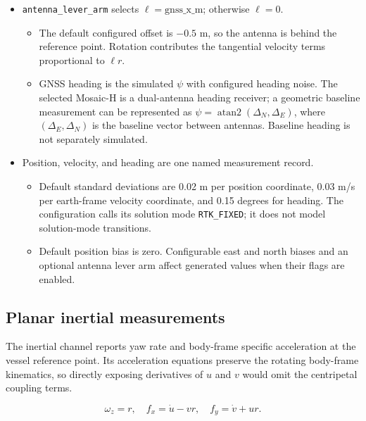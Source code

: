 \documentclass[10pt,letterpaper]{article}
\begin{document}
\begin{itemize}
\item
  \texttt{antenna\_lever\_arm} selects \(\ell = \text{gnss\_x\_m}\); otherwise \(\ell = 0\).

  \begin{itemize}
  \item
    The default configured offset is \(- 0.5\) m, so the antenna is behind the reference point. Rotation contributes the tangential velocity terms proportional to \(\ell r\).
  \item
    GNSS heading is the simulated \(\psi\) with configured heading noise. The selected Mosaic-H is a dual-antenna heading receiver; a geometric baseline measurement can be represented as \(\psi = \operatorname{atan2}\left( \Delta_{N},\Delta_{E} \right)\), where \(\left( \Delta_{E},\Delta_{N} \right)\) is the baseline vector between antennas. Baseline heading is not separately simulated.
  \end{itemize}
\item
  Position, velocity, and heading are one named measurement record.

  \begin{itemize}
  \item
    Default standard deviations are 0.02 m per position coordinate, 0.03 m/s per earth-frame velocity coordinate, and 0.15 degrees for heading. The configuration calls its solution mode \texttt{RTK\_FIXED}; it does not model solution-mode transitions.
  \item
    Default position bias is zero. Configurable east and north biases and an optional antenna lever arm affect generated values when their flags are enabled.
  \end{itemize}
\end{itemize}

\subsection{Planar inertial measurements}

The inertial channel reports yaw rate and body-frame specific acceleration at the vessel reference point. Its acceleration equations preserve the rotating body-frame kinematics, so directly exposing derivatives of \(u\) and \(v\) would omit the centripetal coupling terms.

\begin{equation}
\omega_{z} = r,\quad f_{x} = \dot{u} - vr,\quad f_{y} = \dot{v} + ur.
\end{equation}
\end{document}
